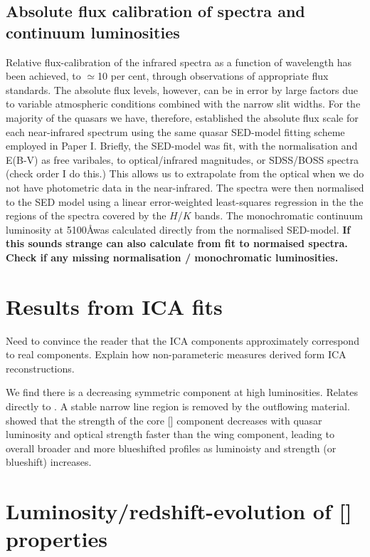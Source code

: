 \subsection{Absolute flux calibration of spectra and continuum luminosities}

Relative flux-calibration of the infrared spectra as a function of wavelength has been achieved, to $\simeq$10 per cent, through observations of appropriate flux standards. 
The absolute flux levels, however, can be in error by large factors due to variable atmospheric conditions combined with the narrow slit widths. 
For the majority of the quasars we have, therefore, established the absolute flux scale for each near-infrared spectrum using the same quasar SED-model fitting scheme employed in Paper I.
Briefly, the SED-model was fit, with the normalisation and E(B-V) as free varibales, to optical/infrared magnitudes, or SDSS/BOSS spectra (check order I do this.)
This allows us to extrapolate from the optical when we do not have photometric data in the near-infrared. 
The spectra were then normalised to the SED model using a linear error-weighted least-squares regression in the the regions of the spectra covered by the $H$/$K$ bands. 
The monochromatic continuum luminosity at 5100\AA was calculated directly from the normalised SED-model. 
{\bf If this sounds strange can also calculate from fit to normaised spectra.}
{\bf Check if any missing normalisation / monochromatic luminosities.} 

\section{Results from ICA fits}

Need to convince the reader that the ICA components approximately correspond to real components. 
Explain how non-parameteric measures derived form ICA reconstructions. 

We find there is a decreasing symmetric component at high luminosities. 
Relates directly to \citet{shen14}. 
A stable narrow line region is removed by the outflowing material. 
\citet{shen14} showed that the strength of the core [] component decreases with quasar luminosity and optical  strength faster than the wing component, leading to overall broader and more blueshifted profiles as luminoisty and  strength (or  blueshift) increases. 

\section{Luminosity/redshift-evolution of [] properties}

